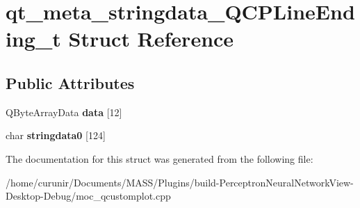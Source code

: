 \hypertarget{structqt__meta__stringdata___q_c_p_line_ending__t}{}\section{qt\+\_\+meta\+\_\+stringdata\+\_\+\+Q\+C\+P\+Line\+Ending\+\_\+t Struct Reference}
\label{structqt__meta__stringdata___q_c_p_line_ending__t}
\subsection*{Public Attributes}
\begin{DoxyCompactItemize}
\item 
Q\+Byte\+Array\+Data {\bfseries data} \mbox{[}12\mbox{]}\hypertarget{structqt__meta__stringdata___q_c_p_line_ending__t_afd1b8860d3c0d66e6e4abf54197c47e6}{}\label{structqt__meta__stringdata___q_c_p_line_ending__t_afd1b8860d3c0d66e6e4abf54197c47e6}

\item 
char {\bfseries stringdata0} \mbox{[}124\mbox{]}\hypertarget{structqt__meta__stringdata___q_c_p_line_ending__t_a20c616613071fe30d8f5bcf67c6851b2}{}\label{structqt__meta__stringdata___q_c_p_line_ending__t_a20c616613071fe30d8f5bcf67c6851b2}

\end{DoxyCompactItemize}


The documentation for this struct was generated from the following file\+:\begin{DoxyCompactItemize}
\item 
/home/curunir/\+Documents/\+M\+A\+S\+S/\+Plugins/build-\/\+Perceptron\+Neural\+Network\+View-\/\+Desktop-\/\+Debug/moc\+\_\+qcustomplot.\+cpp\end{DoxyCompactItemize}
